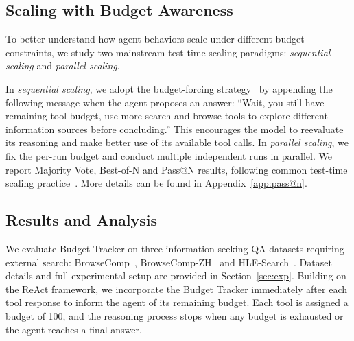 \subsection{Scaling with Budget Awareness} 
To better understand how agent behaviors scale under different budget constraints, we study two mainstream test-time scaling paradigms: \emph{sequential scaling} and \emph{parallel scaling}. 

In \textit{sequential scaling}, we adopt the budget-forcing strategy~\citep{DBLP:journals/corr/abs-2501-19393} by appending the following message when the agent proposes an answer: ``Wait, you still have remaining tool budget, use more search and browse tools to explore different information sources before concluding.''
This encourages the model to reevaluate its reasoning and make better use of its available tool calls.
In \textit{parallel scaling}, we fix the per-run budget and conduct multiple independent runs in parallel.
We report Majority Vote, Best-of-N and Pass@N results, following common test-time scaling practice~\citep{DBLP:journals/corr/abs-2504-12516}. More details can be found in Appendix~\ref{app:pass@n}.



\subsection{Results and Analysis}

We evaluate Budget Tracker on three information-seeking QA datasets requiring external search: BrowseComp~\citep{DBLP:journals/corr/abs-2504-12516}, BrowseComp-ZH~\citep{DBLP:journals/corr/abs-2504-19314} and HLE-Search~\citep{DBLP:journals/corr/abs-2501-14249, DBLP:journals/corr/abs-2507-16075}. Dataset details and full experimental setup are provided in Section~\ref{sec:exp}.
Building on the ReAct framework, we incorporate the Budget Tracker immediately after each tool response to inform the agent of its remaining budget. Each tool is assigned a budget of 100, and the reasoning process stops when any budget is exhausted or the agent reaches a final answer.

